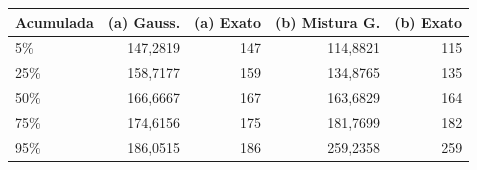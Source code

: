 \begin{tabular}{lrrrr}
\toprule
Acumulada & (a) Gauss. & (a) Exato & (b) Mistura G. & (b) Exato \\
\midrule
5\% & 147,2819 & 147 & 114,8821 & 115 \\
25\% & 158,7177 & 159 & 134,8765 & 135 \\
50\% & 166,6667 & 167 & 163,6829 & 164 \\
75\% & 174,6156 & 175 & 181,7699 & 182 \\
95\% & 186,0515 & 186 & 259,2358 & 259 \\
\bottomrule
\end{tabular}
